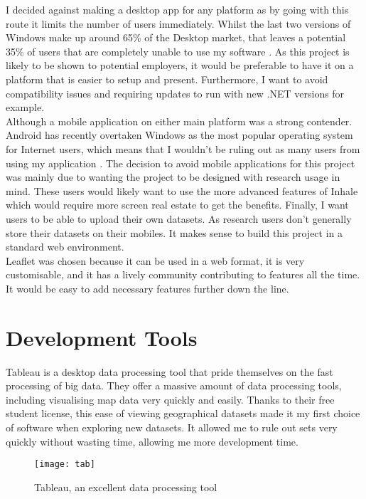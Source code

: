 I decided against making a desktop app for any platform as by going with this route it limits the number of users immediately. Whilst the last two versions of Windows make up around 65\% of the Desktop market, that leaves a potential 35\% of users that are completely unable to use my software \cite{windows}. As this project is likely to be shown to potential employers, it would be preferable to have it on a platform that is easier to setup and present. Furthermore, I want to avoid compatibility issues and requiring updates to run with new .NET versions for example.\\

Although a mobile application on either main platform was a strong contender. Android has recently overtaken Windows as the most popular operating system for Internet users, which means that I wouldn't be ruling out as many users from using my application \cite{android}. The decision to avoid mobile applications for this project was mainly due to wanting the project to be designed with research usage in mind. These users would likely want to use the more advanced features of Inhale which would require more screen real estate to get the benefits. Finally, I want users to be able to upload their own datasets. As research users don't generally store their datasets on their mobiles. It makes sense to build this project in a standard web environment.\\

Leaflet was chosen because it can be used in a web format, it is very customisable, and it has a lively community contributing to features all the time. It would be easy to add necessary features further down the line.

\section{Development Tools}

Tableau is a desktop data processing tool that pride themselves on the fast processing of big data. They offer a massive amount of data processing tools, including visualising map data very quickly and easily. Thanks to their free student license, this ease of viewing geographical datasets made it my first choice of software when exploring new datasets. It allowed me to rule out sets very quickly without wasting time, allowing me more development time.\\

\begin{figure}[H]
\begin{center}
\texttt{[image: tab]}
\label{fig:tabf}
\caption{Tableau, an excellent data processing tool}
\end{center}
\end{figure}

